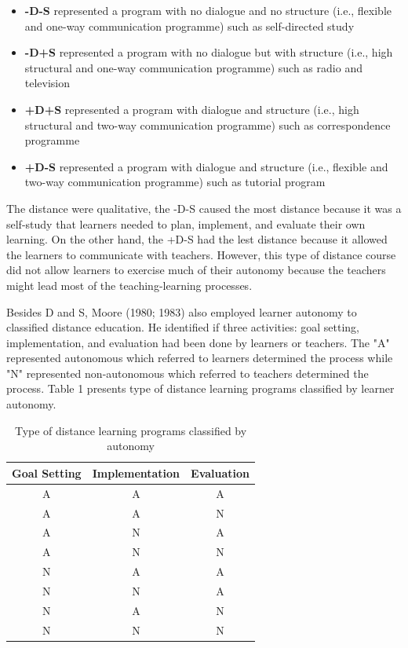 \begin{itemize}
\item \textbf{-D-S} represented a program with no dialogue and no structure (i.e., flexible and one-way communication programme) such as self-directed study
\item \textbf{-D+S} represented a program with no dialogue but with structure (i.e., high structural and one-way communication programme)  such as radio and television 
\item \textbf{+D+S} represented a program with dialogue and structure (i.e., high structural and two-way communication programme) such as correspondence programme  
\item \textbf{+D-S} represented a program with dialogue and structure (i.e., flexible and two-way communication programme) such as tutorial program 
\end{itemize}

 
The distance were qualitative, the -D-S caused the most distance because it was a self-study that learners needed to plan, implement, and evaluate their own learning. On the other hand, the +D-S had the lest distance because it allowed the learners to communicate with teachers. However, this type of distance course did not allow learners to exercise much of their autonomy because the teachers might lead most of the teaching-learning processes. 


Besides D and S, Moore (1980; 1983) \cite{moore1980independent, moore1983individual} also employed learner autonomy to classified distance education. He identified if three activities: goal setting, implementation, and evaluation had been done by learners or teachers. The "A" represented autonomous which referred to learners determined the process while "N" represented non-autonomous which referred to teachers determined the process. Table 1 presents type of distance learning programs classified by learner autonomy. 

\begin{table}[!htb]
\centering
\caption{Type of distance learning programs classified by autonomy \cite{moore1980independent}}
\begin{tabular}{ |c|c|c| } 
 \hline
 Goal Setting & Implementation & Evaluation \\ 
\hline
 A & A & A \\ 
\hline
 A & A & N \\ 
 \hline
 A & N & A \\ 
\hline
 A & N & N \\ 
 \hline
 N & A & A \\ 
\hline
  N & N & A \\ 
 \hline
  N & A & N \\ 
\hline
  N & N & N \\ 
 \hline
\end{tabular}
\end{table}

